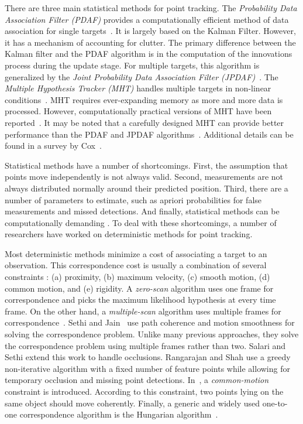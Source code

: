 There are three main statistical methods for point tracking.  The \emph{Probability Data Association Filter (PDAF)} provides a computationally efficient method of data association for single targets~\cite{1975_JNL_PDAF_BarShalom}.  It is largely based on the Kalman Filter.  However, it has a mechanism of accounting for clutter.  The primary difference between the Kalman filter and the PDAF algorithm is in the computation of the innovations process during the update stage.  For multiple targets, this algorithm is generalized by the \emph{Joint Probability Data Association Filter (JPDAF)}~\cite{1983_JNL_JPDAF_Fortmann}.  The \emph{Multiple Hypothesis Tracker (MHT)} handles multiple targets in non-linear conditions~\cite{1979_JNL_MTT_Reid}.  MHT requires ever-expanding memory as more and more data is processed.  However, computationally practical versions of MHT have been reported~\cite{1996_JNL_EfficientMHT_Cox, 1994_CNF_MLPMHT_Streit}.  It may be noted that a carefully designed MHT can provide better performance than the PDAF and JPDAF algorithms~\cite{2009_JNL_PDAF_Barshalom}.  Additional details can be found in a survey by Cox~\cite{1993_JNL_SURVEYcorresp_Cox}.  

Statistical methods have a number of shortcomings.  First, the assumption that points move independently is not always valid.  Second, measurements are not always distributed normally around their predicted position.  Third, there are a number of parameters to estimate, such as apriori probabilities for false measurements and missed detections.  And finally, statistical methods can be computationally demanding \cite{2001_JNL_MotionCorrespondence_Veenman}.  To deal with these shortcomings, a number of researchers have worked on deterministic methods for point tracking.

Most deterministic methods minimize a cost of associating a target to an observation.  This correspondence cost is usually a combination of several constraints \cite{2006_JNL_SURVEYtrk_Yilmaz}: (a) proximity, (b) maximum velocity, (c) smooth motion, (d) common motion, and (e) rigidity.  A \emph{zero-scan} algorithm uses one frame for correspondence and picks the maximum likelihood hypothesis at every time frame.  On the other hand, a \emph{multiple-scan} algorithm uses multiple frames for correspondence~\cite{1979_JNL_MTT_Reid}.    Sethi and Jain~\cite{1987_JNL_FeatureTrajectories_Sethi} use path coherence and motion smoothness for solving the correspondence problem.  Unlike many previous approaches, they solve the correspondence problem using multiple frames rather than two.  Salari and Sethi \cite{1990_JNL_PointCorresp_Salari} extend this work to handle occlusions.  Rangarajan and Shah \cite{1991_JNL_MotionCorrespondence_Rangarajan} use a greedy non-iterative algorithm with a fixed number of feature points while allowing for temporary occlusion and missing point detections.  In~\cite{2001_JNL_MotionCorrespondence_Veenman}, a \emph{common-motion} constraint is introduced.  According to this constraint, two points lying on the same object should move coherently.  Finally, a generic and widely used one-to-one correspondence algorithm is the Hungarian algorithm~\cite{1955_JNL_HungarianMethod_Kuhn}.

